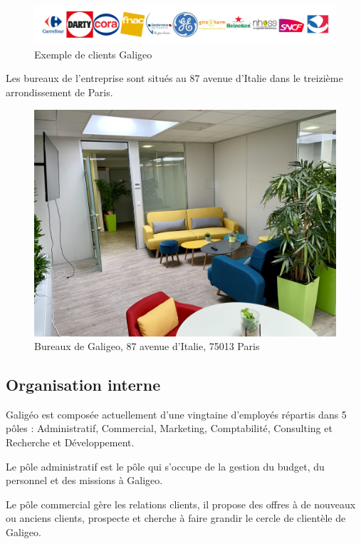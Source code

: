 \begin{figure}[H]
    \centering
    \includegraphics[width=\linewidth]{images/logos/client.png}
    \caption{Exemple de clients Galigeo}
    \label{fig:clients}
\end{figure}

Les bureaux de l'entreprise sont situés au 87 avenue d'Italie dans le treizième arrondissement de Paris.

\begin{figure}[H]
    \centering
    \includegraphics[width=12cm]{images/photos/bureaux_galigeo.png}
    \caption{Bureaux de Galigeo, 87 avenue d'Italie, 75013 Paris}
    \label{fig:offices}
\end{figure}


\subsection{Organisation interne}

Galigéo est composée actuellement d’une vingtaine d’employés répartis dans 5 pôles : Administratif, Commercial, Marketing, Comptabilité, Consulting et Recherche et Développement.

Le pôle administratif est le pôle qui s’occupe de la gestion du budget, du personnel et des missions à Galigeo.

Le pôle commercial gère les relations clients, il propose des offres à de nouveaux ou anciens clients, prospecte et cherche à faire grandir le cercle de clientèle de Galigeo.

